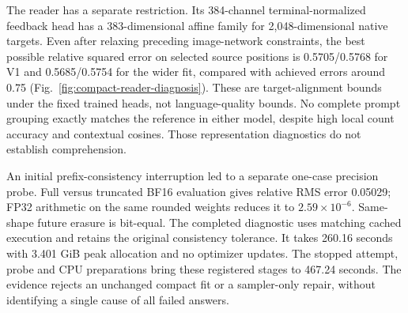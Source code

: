 The reader has a separate restriction. Its 384-channel terminal-normalized
feedback head has a 383-dimensional affine family for 2,048-dimensional
native targets. Even after relaxing preceding image-network constraints,
the best possible relative squared error on selected source positions is
0.5705/0.5768 for V1 and 0.5685/0.5754 for the wider fit, compared with
achieved errors around 0.75 (Fig.~\ref{fig:compact-reader-diagnosis}).
These are target-alignment bounds under the fixed trained heads, not
language-quality bounds. No complete prompt grouping exactly matches the
reference in either model, despite high local count accuracy and contextual
cosines. Those representation diagnostics do not establish comprehension.

An initial prefix-consistency interruption led to a separate one-case
precision probe. Full versus truncated BF16 evaluation gives relative RMS
error 0.05029; FP32 arithmetic on the same rounded weights reduces it to
$2.59\times10^{-6}$. Same-shape future erasure is bit-equal. The completed
diagnostic uses matching cached execution and retains the original
consistency tolerance. It takes 260.16 seconds with 3.401 GiB peak allocation
and no optimizer updates. The stopped attempt, probe and CPU preparations
bring these registered stages to 467.24 seconds. The evidence rejects an
unchanged compact fit or a sampler-only repair, without identifying a single
cause of all failed answers.



